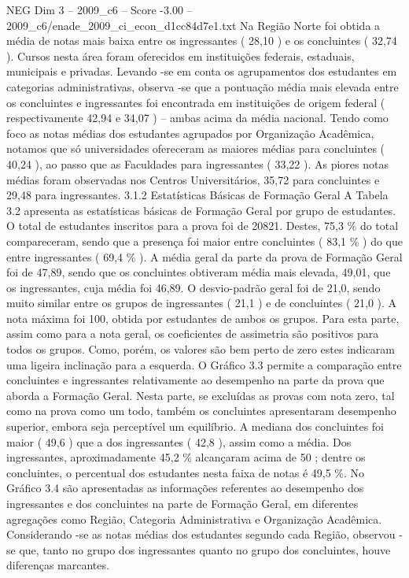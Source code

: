 \begin{textsample}{NEG Dim 3 – 2009\_c6 – Score -3.00 – 2009\_c6/enade\_2009\_ci\_econ\_d1cc84d7e1.txt}
Na Região Norte foi obtida a média de notas mais baixa entre os ingressantes ( 28,10 ) e os concluintes ( 32,74 ).
Cursos nesta área foram oferecidos em instituições federais, estaduais, municipais e privadas.
Levando -se em conta os agrupamentos dos estudantes em categorias administrativas, observa -se que a pontuação média mais elevada entre os concluintes e ingressantes foi encontrada em instituições de origem federal ( respectivamente 42,94 e 34,07 ) – ambas acima da média nacional.
Tendo como foco as notas médias dos estudantes agrupados por Organização Acadêmica, notamos que só universidades ofereceram as maiores médias para concluintes ( 40,24 ), ao passo que as Faculdades para ingressantes ( 33,22 ).
As piores notas médias foram observadas nos Centros Universitários, 35,72 para concluintes e 29,48 para ingressantes. 3.1.2 Estatísticas Básicas de Formação Geral A Tabela 3.2 apresenta as estatísticas básicas de Formação Geral por grupo de estudantes.
O total de estudantes inscritos para a prova foi de 20821.
Destes, 75,3 \% do total compareceram, sendo que a presença foi maior entre concluintes ( 83,1 \% ) do que entre ingressantes ( 69,4 \% ).
A média geral da parte da prova de Formação Geral foi de 47,89, sendo que os concluintes obtiveram média mais elevada, 49,01, que os ingressantes, cuja média foi 46,89.
O desvio-padrão geral foi de 21,0, sendo muito similar entre os grupos de ingressantes ( 21,1 ) e de concluintes ( 21,0 ).
A nota máxima foi 100, obtida por estudantes de ambos os grupos.
Para esta parte, assim como para a nota geral, os coeficientes de assimetria são positivos para todos os grupos.
Como, porém, os valores são bem perto de zero estes indicaram uma ligeira inclinação para a esquerda.
O Gráfico 3.3 permite a comparação entre concluintes e ingressantes relativamente ao desempenho na parte da prova que aborda a Formação Geral.
Nesta parte, se excluídas as provas com nota zero, tal como na prova como um todo, também os concluintes apresentaram desempenho superior, embora seja perceptível um equilíbrio.
A mediana dos concluintes foi maior ( 49,6 ) que a dos ingressantes ( 42,8 ), assim como a média.
Dos ingressantes, aproximadamente 45,2 \% alcançaram acima de 50 ; dentre os concluintes, o percentual dos estudantes nesta faixa de notas é 49,5 \%.
No Gráfico 3.4 são apresentadas as informações referentes ao desempenho dos ingressantes e dos concluintes na parte de Formação Geral, em diferentes agregações como Região, Categoria Administrativa e Organização Acadêmica.
Considerando -se as notas médias dos estudantes segundo cada Região, observou -se que, tanto no grupo dos ingressantes quanto no grupo dos concluintes, houve diferenças marcantes.

\end{textsample}
